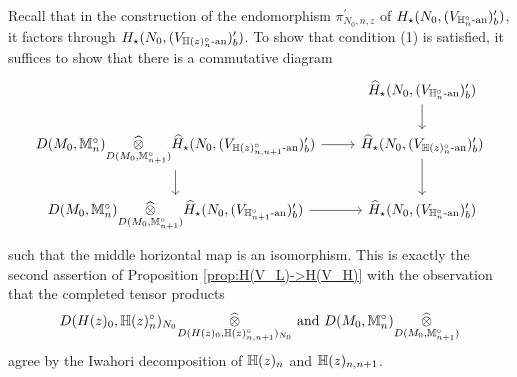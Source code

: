 \documentclass[10pt]{amsart}
\begin{document}
Recall that in the construction of the endomorphism $\pi_{N_{0},n,z}^{\prime}$ of $H_{\star}(N_{0},(V_{\mathbb{H}_{n}^{\circ}\textnormal{-an}})_{b}^{\prime})$, it factors through $H_{\star}(N_{0},(V_{\mathbb{H}(z)_{n}^{\circ}\textnormal{-an}})_{b}^{\prime})$. To show that condition (1) is satisfied, it suffices to show that there is a commutative diagram \begin{equation}\label{eqn:factorization_H(z)_n,n+1}
\begin{tikzcd}
	 & \widehat{H}_{\star}(N_{0},(V_{\h_{n}^{\circ}\An})_{b}^{\prime}) \arrow[d] \\ 
D(M_{0},\m_{n}^{\circ})\underset{D(M_{0},\m_{n+1}^{\circ})}{\widehat{\otimes}} \widehat{H}_{\star}(N_{0},(V_{\h(z)_{n,n+1}^{\circ}\An})_{b}^{\prime})\arrow[r] \arrow[d] & \widehat{H}_{\star}(N_{0},(V_{\h(z)_{n}^{\circ}\An})_{b}^{\prime}) \arrow[d] \\ 
     D(M_{0},\m_{n}^{\circ})\underset{D(M_{0},\m_{n+1}^{\circ})}{\widehat{\otimes}} \widehat{H}_{\star}(N_{0},(V_{\h_{n+1}^{\circ}\An})_{b}^{\prime})\arrow[r] & \widehat{H}_{\star}(N_{0},(V_{\h_{n}^{\circ}\An})_{b}^{\prime})
\end{tikzcd}
\end{equation}
such that the middle horizontal map is an isomorphism. This is exactly the second assertion of Proposition \ref{prop:H(V_L)->H(V_H)} with the observation that the completed tensor products \begin{equation*}
    D(H(z)_{0},\mathbb{H}(z)_{n}^{\circ})_{N_{0}}\underset{D(H(z)_{0},\mathbb{H}(z)_{n,n+1}^{\circ})_{N_{0}}}{\widehat{\otimes}} \textnormal{ and }  D(M_{0},\mathbb{M}_{n}^{\circ})\underset{D(M_{0},\mathbb{M}_{n+1}^{\circ})}{\widehat{\otimes}}
\end{equation*} agree by the Iwahori decomposition of $\mathbb{H}(z)_{n}$ and $\mathbb{H}(z)_{n,n+1}$.
\end{document}
